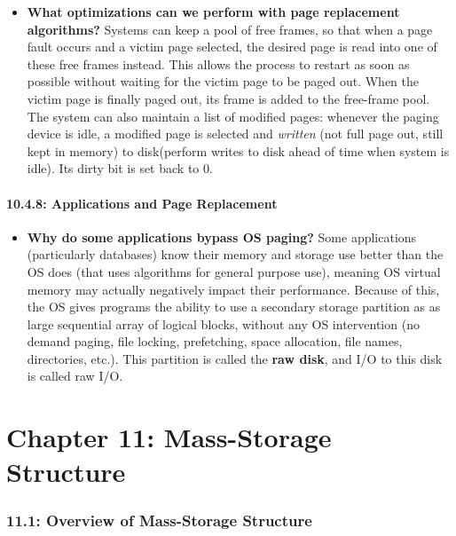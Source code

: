 \documentclass[12pt]{article}
\begin{document}
\begin{itemize}
    \item \textbf{What optimizations can we perform with page replacement algorithms?} Systems can keep a pool of free frames, so that when a page fault occurs and a victim page selected, the desired page is read into one of these free frames instead. This allows the process to restart as soon as possible without waiting for the victim page to be paged out. When the victim page is finally paged out, its frame is added to the free-frame pool. The system can also maintain a list of modified pages: whenever the paging device is idle, a modified page is selected and \textit{written} (not full page out, still kept in memory) to disk(perform writes to disk ahead of time when system is idle). Its dirty bit is set back to 0.
\end{itemize}

\subsection*{10.4.8: Applications and Page Replacement}

\begin{itemize}
    \item \textbf{Why do some applications bypass OS paging?} Some applications (particularly databases) know their memory and storage use better than the OS does (that uses algorithms for general purpose use), meaning OS virtual memory may actually negatively impact their performance. Because of this, the OS gives programs the ability to use a secondary storage partition as as large sequential array of logical blocks, without any OS intervention (no demand paging, file locking, prefetching, space allocation, file names, directories, etc.). This partition is called the \textbf{raw disk}, and I/O to this disk is called raw I/O.
\end{itemize}

\part*{Chapter 11: Mass-Storage Structure}

\section*{11.1: Overview of Mass-Storage Structure}
\end{document}
